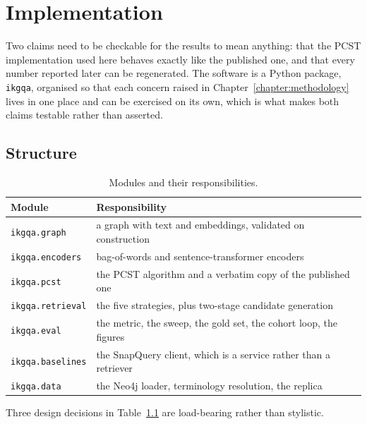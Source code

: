 \chapter{Implementation} \label{chapter:implementation}

Two claims need to be checkable for the results to mean anything: that the PCST
implementation used here behaves exactly like the published one, and that every
number reported later can be regenerated. The software is a Python package,
\texttt{ikgqa}, organised so that each concern raised in
Chapter~\ref{chapter:methodology} lives in one place and can be exercised on its
own, which is what makes both claims testable rather than asserted.

\section{Structure} \label{sec:implementation-structure}

\begin{table}[t]
\centering
\caption{Modules and their responsibilities.}
\label{tab:modules}
\begin{tabular}{ll}
\toprule
Module & Responsibility \\
\midrule
\texttt{ikgqa.graph} & a graph with text and embeddings, validated on construction \\
\texttt{ikgqa.encoders} & bag-of-words and sentence-transformer encoders \\
\texttt{ikgqa.pcst} & the PCST algorithm and a verbatim copy of the published one \\
\texttt{ikgqa.retrieval} & the five strategies, plus two-stage candidate generation \\
\texttt{ikgqa.eval} & the metric, the sweep, the gold set, the cohort loop, the figures \\
\texttt{ikgqa.baselines} & the SnapQuery client, which is a service rather than a retriever \\
\texttt{ikgqa.data} & the Neo4j loader, terminology resolution, the replica \\
\bottomrule
\end{tabular}
\end{table}

Three design decisions in Table~\ref{tab:modules} are load-bearing rather than
stylistic.

